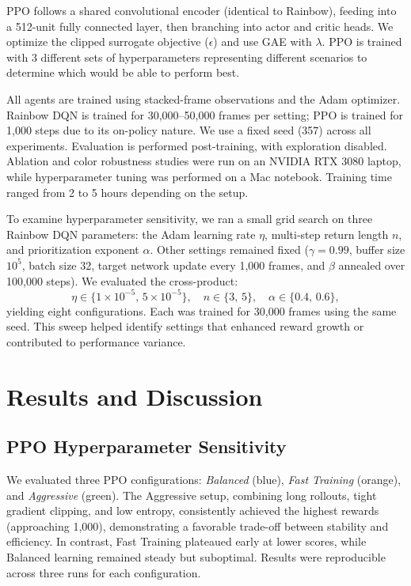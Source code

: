 \documentclass{article}
\begin{document}
PPO follows a shared convolutional encoder (identical to Rainbow), feeding into a 512-unit fully connected layer, then branching into actor and critic heads. We optimize the clipped surrogate objective ($\epsilon$) and use GAE with $\lambda$. PPO is trained with 3 different sets of hyperparameters representing different scenarios to determine which would be able to perform best.

All agents are trained using stacked-frame observations and the Adam optimizer. Rainbow DQN is trained for 30,000–50,000 frames per setting; PPO is trained for 1,000 steps due to its on-policy nature. We use a fixed seed (357) across all experiments. Evaluation is performed post-training, with exploration disabled. Ablation and color robustness studies were run on an NVIDIA RTX 3080 laptop, while hyperparameter tuning was performed on a Mac notebook. Training time ranged from 2 to 5 hours depending on the setup.

To examine hyperparameter sensitivity, we ran a small grid search on three Rainbow DQN parameters: the Adam learning rate $\eta$, multi-step return length $n$, and prioritization exponent $\alpha$. Other settings remained fixed ($\gamma=0.99$, buffer size $10^5$, batch size 32, target network update every 1,000 frames, and $\beta$ annealed over 100,000 steps). We evaluated the cross-product:
\[
\eta \in \{1\times10^{-5},\,5\times10^{-5}\},\quad
n \in \{3,\,5\},\quad
\alpha \in \{0.4,\,0.6\},
\]
yielding eight configurations. Each was trained for 30,000 frames using the same seed. This sweep helped identify settings that enhanced reward growth or contributed to performance variance.

\section{Results and Discussion}

\subsection{PPO Hyperparameter Sensitivity}

We evaluated three PPO configurations: \textit{Balanced} (blue), \textit{Fast Training} (orange), and \textit{Aggressive} (green). The Aggressive setup, combining long rollouts, tight gradient clipping, and low entropy, consistently achieved the highest rewards (approaching 1,000), demonstrating a favorable trade-off between stability and efficiency. In contrast, Fast Training plateaued early at lower scores, while Balanced learning remained steady but suboptimal. Results were reproducible across three runs for each configuration.
\end{document}

